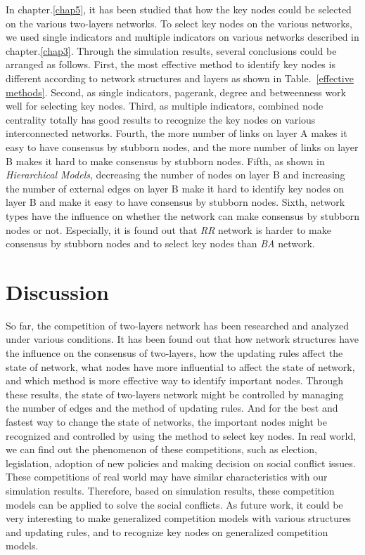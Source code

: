 In chapter.\ref{chap5}, it has been studied that how the key nodes could be selected on the various two-layers networks. To select key nodes on the various networks, we used single indicators and multiple indicators on various networks described in chapter.\ref{chap3}. Through the simulation results, several conclusions could be arranged as follows. First, the most effective method to identify key nodes is different according to network structures and layers as shown in Table.~\ref{effective methods}. Second, as single indicators, pagerank, degree and betweenness work well for selecting key nodes. Third, as multiple indicators, combined node centrality totally has good results to recognize the key nodes on various interconnected networks. Fourth, the more number of links on layer A makes it easy to have consensus by stubborn nodes, and the more number of links on layer B makes it hard to make consensus by stubborn nodes. Fifth, as shown in \textit{Hierarchical Models}, decreasing the number of nodes on layer B and increasing the number of external edges on layer B make it hard to identify key nodes on layer B and make it easy to have consensus by stubborn nodes. Sixth, network types have the influence on whether the network can make consensus by stubborn nodes or not. Especially, it is found out that \textit{RR} network is harder to make consensus by stubborn nodes and to select key nodes than \textit{BA} network. \\
  
\section{Discussion} 
So far, the competition of two-layers network has been researched and analyzed under various conditions. It has been found out that how network structures have the influence on the consensus of two-layers, how the updating rules affect the state of network, what nodes have more influential to affect the state of network, and which method is more effective way to identify important nodes. Through these results, the state of two-layers network might be controlled by managing the number of edges and the method of updating rules. And for the best and fastest way to change the state of networks, the important nodes might be recognized and controlled by using the method to select key nodes.
In real world, we can find out the phenomenon of these competitions, such as election, legislation, adoption of new policies and making decision on social conflict issues. These competitions of real world may have similar characteristics with our simulation results. Therefore, based on simulation results, these competition models can be applied to solve the social conflicts. As future work, it could be very interesting to make generalized competition models with various structures and updating rules, and to recognize key nodes on generalized competition models.   
